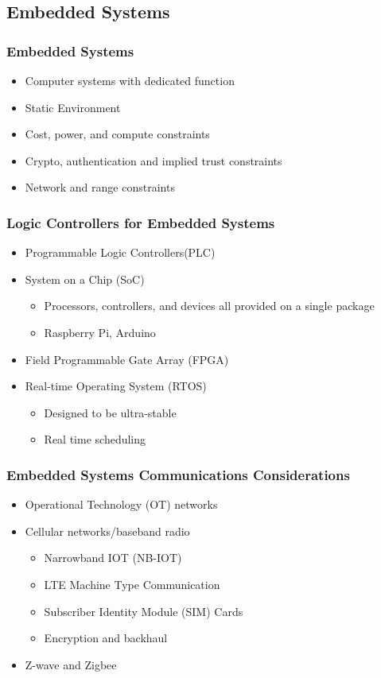 	\subsection {Embedded Systems}
		\subsubsection {Embedded Systems}
			\begin{itemize}
				\item Computer systems with dedicated function
				\item Static Environment
				\item Cost, power, and compute constraints
				\item Crypto, authentication and implied trust constraints
				\item Network and range constraints
			\end{itemize}
		\subsubsection {Logic Controllers for Embedded Systems}
			\begin{itemize}
				\item Programmable Logic Controllers(PLC)
				\item System on a Chip (SoC)
					\begin{itemize}
						\item Processors, controllers, and devices all provided
							on a single package
						\item Raspberry Pi, Arduino
					\end{itemize}
				\item Field Programmable Gate Array (FPGA)
				\item Real-time Operating System (RTOS)
					\begin{itemize}
						\item Designed to be ultra-stable
						\item Real time scheduling
					\end{itemize}
			\end{itemize}
		\subsubsection {Embedded Systems Communications Considerations}
			\begin{itemize}
				\item Operational Technology (OT) networks
				\item Cellular networks/baseband radio
					\begin{itemize}
						\item Narrowband IOT (NB-IOT)
						\item LTE Machine Type Communication
						\item Subscriber Identity Module (SIM) Cards
						\item Encryption and backhaul
					\end{itemize}
				\item Z-wave and Zigbee
			\end{itemize}
